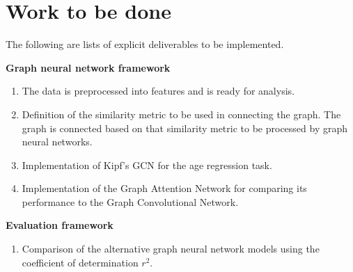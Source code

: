 \section*{Work to be done}
\label{section:work}


The following are lists of explicit deliverables to be implemented.

\textbf{Graph neural network framework}
\begin{enumerate}[label=G\arabic*.]
  \item The data is preprocessed into features and is ready for analysis. %
  \item Definition of the similarity metric to be used in connecting the graph. The graph is connected based on that similarity metric to be processed by graph neural networks.
  \item Implementation of Kipf's GCN \cite{kipf2017semi} for the age regression task.
  \item Implementation of the Graph Attention Network for comparing its performance to the Graph Convolutional Network.
\end{enumerate}

\textbf{Evaluation framework}

\begin{enumerate}[label=E\arabic*.]
  \item  Comparison of the alternative graph neural network models using the coefficient of determination $r^2$.
\end{enumerate}

